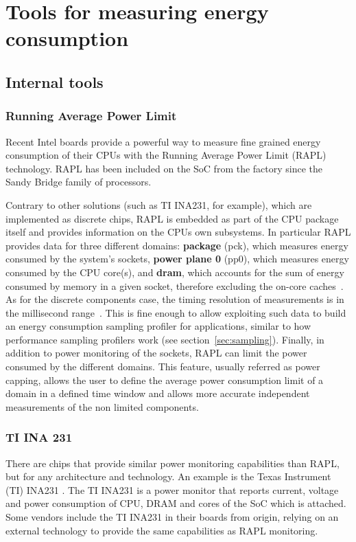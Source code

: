 \section{Tools for measuring energy consumption}

\subsection*{Internal tools}

\subsubsection*{Running Average Power Limit}
Recent Intel boards provide a powerful way to measure fine grained energy consumption of their CPUs with the Running Average Power Limit (RAPL) technology. RAPL has been included on the SoC from the factory since the Sandy Bridge family of processors.

Contrary to other solutions (such as TI INA231, for example), which are implemented as discrete
chips, RAPL is embedded as part of the CPU package itself and
provides information on the CPUs own subsystems. In particular RAPL
provides data for three different domains: \textbf{package} (pck),
which measures energy consumed by the system's sockets, \textbf{power
plane 0} (pp0), which measures energy consumed by the CPU core(s),
and \textbf{dram}, which accounts for the sum of energy consumed
by memory in a given socket, therefore excluding the on-core
caches~\cite{INTELMAN}. As for the discrete components case, the
timing resolution of measurements is in the millisecond range~\cite{RAPL1}.
This is fine enough to allow exploiting such data to build an energy
consumption sampling profiler for applications, similar to how performance
sampling profilers work (see section~\ref{sec:sampling}).
Finally, in addition to power
monitoring of the sockets, RAPL can limit the power consumed by the
different domains. This feature, usually referred as power capping,
allows the user to define the average power consumption limit of a
domain in a defined time window and allows more accurate independent
measurements of the non limited components.

\subsubsection*{TI INA 231}
There are chips that provide similar power monitoring capabilities than RAPL, but for any architecture and technology. An example is the Texas Instrument (TI) INA231 \cite{TIINA231}. The TI INA231 is a power monitor that reports current, voltage and power consumption of CPU, DRAM and cores of the SoC which is attached. Some vendors include the TI INA231 in their boards from origin, relying on an external technology to provide the same capabilities as RAPL monitoring.

